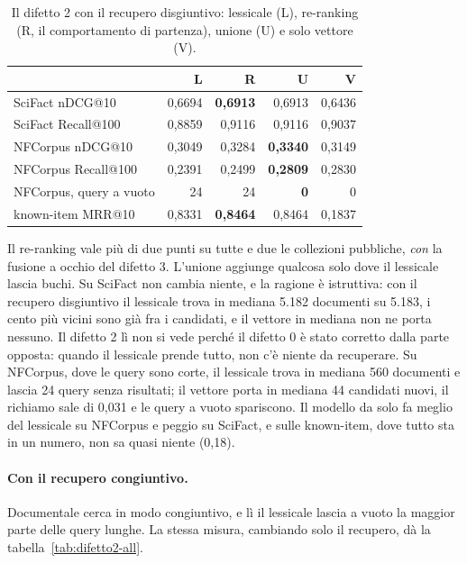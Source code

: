 \begin{table}[ht]
  \centering
  \begin{tabular}{lrrrr}
    \toprule
    & L & R & U & V \\
    \midrule
    SciFact nDCG@10 & 0,6694 & \textbf{0,6913} & 0,6913 & 0,6436 \\
    SciFact Recall@100 & 0,8859 & 0,9116 & 0,9116 & 0,9037 \\
    NFCorpus nDCG@10 & 0,3049 & 0,3284 & \textbf{0,3340} & 0,3149 \\
    NFCorpus Recall@100 & 0,2391 & 0,2499 & \textbf{0,2809} & 0,2830 \\
    NFCorpus, query a vuoto & 24 & 24 & \textbf{0} & 0 \\
    known-item MRR@10 & 0,8331 & \textbf{0,8464} & 0,8464 & 0,1837 \\
    \bottomrule
  \end{tabular}
  \caption{Il difetto 2 con il recupero disgiuntivo: lessicale (L), re-ranking
  (R, il comportamento di partenza), unione (U) e solo vettore (V).}
  \label{tab:difetto2-any}
\end{table}

Il re-ranking vale più di due punti su tutte e due le collezioni pubbliche,
\emph{con} la fusione a occhio del difetto 3. L'unione aggiunge qualcosa solo dove
il lessicale lascia buchi. Su SciFact non cambia niente, e la ragione è istruttiva:
con il recupero disgiuntivo il lessicale trova in mediana 5.182 documenti su 5.183,
i cento più vicini sono già fra i candidati, e il vettore in mediana non ne porta nessuno. Il
difetto 2 lì non si vede perché il difetto 0 è stato corretto dalla parte
opposta: quando il lessicale prende tutto, non c'è niente da recuperare. Su
NFCorpus, dove le query sono corte, il lessicale trova in mediana 560 documenti e
lascia 24 query senza risultati; il vettore porta in mediana 44 candidati nuovi, il
richiamo sale di 0,031 e le query a vuoto spariscono. Il modello da solo fa meglio
del lessicale su NFCorpus e peggio su SciFact, e sulle known-item, dove tutto sta in
un numero, non sa quasi niente (0,18).

\paragraph{Con il recupero congiuntivo.} Documentale cerca in modo congiuntivo, e lì
il lessicale lascia a vuoto la maggior parte delle query lunghe. La stessa misura,
cambiando solo il recupero, dà la tabella~\ref{tab:difetto2-all}.

